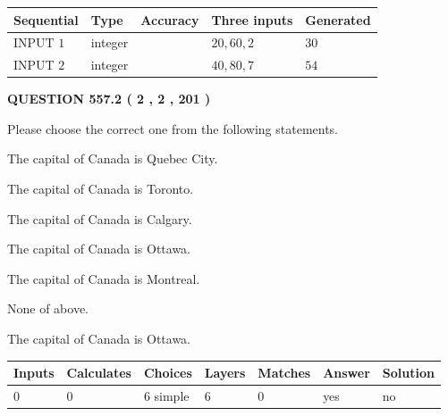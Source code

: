 \documentclass[12pt]{article}
\begin{document}
  
\noindent\begin{tabular}{|l|l|l|l|l|}
\hline
 Sequential & Type & Accuracy & Three inputs & Generated \\ 
\hline
 
 
  INPUT $  1 $ & integer &  & $
 20
 , 
 60
 , 
 2
 $ & $ 30 $ 
 \\  \hline  
 
 
  INPUT $  2 $ & integer &  & $
 40
 , 
 80
 , 
 7
 $ & $ 54 $ 
 \\  \hline  
 \end{tabular}
   
   
  
\vspace{0.2in}
  
{\textbf{\Large{QUESTION
557.2 
 ( 2 , 2 , 201 )
}}}
  
  
Please choose the correct one from the following statements.
 
 
The capital of Canada is Quebec City.
 
 
The capital of Canada is Toronto.
 
 
The capital of Canada is Calgary.
 
 
The capital of Canada is Ottawa.
 
 
The capital of Canada is Montreal.
 
 
 None of above.
 
 
\noindent{}
 
 
The capital of Canada is Ottawa.
 
 
\noindent{}
 
 
   
   
   
   
\noindent\begin{tabular}{|l|l|l|l|l|l|l|}
 \hline
Inputs & Calculates & Choices & Layers & Matches & Answer & Solution \\ \hline
 0  & 
 0  & 
 6
  simple  
  & 
 6  & 
 0  & 
  yes & 
  no 
  \\ \hline
 \end{tabular}
   
   
   
\end{document}
